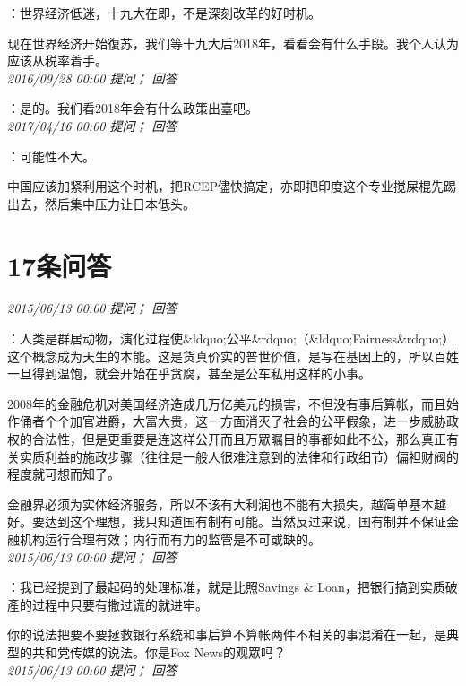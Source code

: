 \documentclass[twocolumn]{ctexart}
\begin{document}
：世界经济低迷，十九大在即，不是深刻改革的好时机。

现在世界经济开始復苏，我们等十九大后2018年，看看会有什么手段。我个人认为应该从税率着手。\\

\textit{\hfill\noindent\small 2016/09/28 00:00 提问； 回答}

：是的。我们看2018年会有什么政策出臺吧。\\

\textit{\hfill\noindent\small 2017/04/16 00:00 提问； 回答}

：可能性不大。

中国应该加紧利用这个时机，把RCEP儘快搞定，亦即把印度这个专业搅屎棍先踢出去，然后集中压力让日本低头。\\

\section{17条问答}

\textit{\hfill\noindent\small 2015/06/13 00:00 提问； 回答}

：人类是群居动物，演化过程使\&ldquo;公平\&rdquo;（\&ldquo;Fairness\&rdquo;）这个概念成为天生的本能。这是货真价实的普世价值，是写在基因上的，所以百姓一旦得到温饱，就会开始在乎贪腐，甚至是公车私用这样的小事。

2008年的金融危机对美国经济造成几万亿美元的损害，不但没有事后算帐，而且始作俑者个个加官进爵，大富大贵，这一方面消灭了社会的公平假象，进一步威胁政权的合法性，但是更重要是连这样公开而且万眾瞩目的事都如此不公，那么真正有关实质利益的施政步骤（往往是一般人很难注意到的法律和行政细节）偏袒财阀的程度就可想而知了。

金融界必须为实体经济服务，所以不该有大利润也不能有大损失，越简单基本越好。要达到这个理想，我只知道国有制有可能。当然反过来说，国有制并不保证金融机构运行合理有效；内行而有力的监管是不可或缺的。\\

\textit{\hfill\noindent\small 2015/06/13 00:00 提问； 回答}

：我已经提到了最起码的处理标准，就是比照Savings \& Loan，把银行搞到实质破產的过程中只要有撒过谎的就进牢。

你的说法把要不要拯救银行系统和事后算不算帐两件不相关的事混淆在一起，是典型的共和党传媒的说法。你是Fox News的观眾吗？\\

\textit{\hfill\noindent\small 2015/06/13 00:00 提问； 回答}
\end{document}
